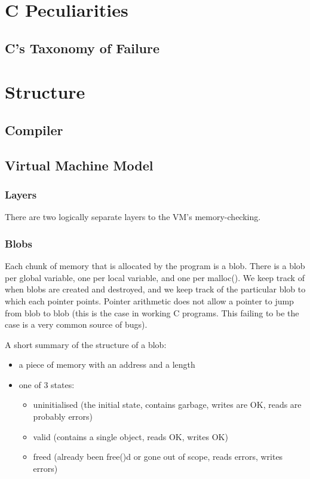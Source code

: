 \documentclass[a4paper]{report}
\begin{document}
\section{C Peculiarities}
\subsection{C's Taxonomy of Failure}


\section{Structure}
\subsection{Compiler}
\subsection{Virtual Machine Model}
\subsubsection{Layers}
There are two logically separate layers to the VM's memory-checking.
\subsubsection{Blobs}
Each chunk of memory that is allocated by the program is a blob. There is a blob per global variable, one per local variable, and one per malloc(). We keep track of when blobs are created and destroyed, and we keep track of the particular blob to which each pointer points. Pointer arithmetic does not allow a pointer to jump from blob to blob (this is the case in working C programs. This failing to be the case is a very common source of bugs).
\par
A short summary of the structure of a blob:
\begin{itemize}
\item a piece of memory with an address and a length
\item one of 3 states:
  \begin{itemize}
  \item uninitialised (the initial state, contains garbage, writes are OK, reads are probably errors)
  \item valid (contains a single object, reads OK, writes OK)
  \item freed (already been free()d or gone out of scope, reads errors, writes errors) 
  \end{itemize}
\end{itemize}
\end{document}
